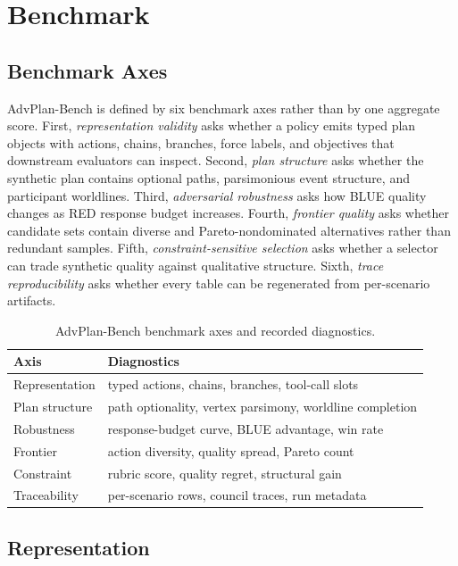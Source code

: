 \documentclass[letterpaper]{article} %
\begin{document}
\section{Benchmark}

\subsection{Benchmark Axes}

AdvPlan-Bench is defined by six benchmark axes rather than by one aggregate score. First, \emph{representation validity} asks whether a policy emits typed plan objects with actions, chains, branches, force labels, and objectives that downstream evaluators can inspect. Second, \emph{plan structure} asks whether the synthetic plan contains optional paths, parsimonious event structure, and participant worldlines. Third, \emph{adversarial robustness} asks how BLUE quality changes as RED response budget increases. Fourth, \emph{frontier quality} asks whether candidate sets contain diverse and Pareto-nondominated alternatives rather than redundant samples. Fifth, \emph{constraint-sensitive selection} asks whether a selector can trade synthetic quality against qualitative structure. Sixth, \emph{trace reproducibility} asks whether every table can be regenerated from per-scenario artifacts.

\begin{table}[t]
\centering
\scriptsize
\caption{AdvPlan-Bench benchmark axes and recorded diagnostics.}
\label{tab:axes}
\begin{tabular}{@{}lp{.58\linewidth}@{}}
\toprule
Axis & Diagnostics \\
\midrule
Representation & typed actions, chains, branches, tool-call slots \\
Plan structure & path optionality, vertex parsimony, worldline completion \\
Robustness & response-budget curve, BLUE advantage, win rate \\
Frontier & action diversity, quality spread, Pareto count \\
Constraint & rubric score, quality regret, structural gain \\
Traceability & per-scenario rows, council traces, run metadata \\
\bottomrule
\end{tabular}
\end{table}

\subsection{Representation}
\end{document}
